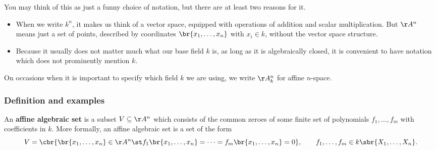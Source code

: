 You may think of this as just a funny choice of notation, but there are at least two reasons for it.
\begin{itemize}
\item When we write $ k^n $, it makes us think of a vector space, equipped with operations of addition and scalar multiplication. But $ \AA^n $ means just a set of points, described by coordinates $ \br{x_1, \dots, x_n} $ with $ x_i \in k $, without the vector space structure.
\item Because it usually does not matter much what our base field $ k $ is, as long as it is algebraically closed, it is convenient to have notation which does not prominently mention $ k $.
\end{itemize}
On occasions when it is important to specify which field $ k $ we are using, we write $ \AA_k^n $ for affine $ n $-space.

\subsubsection{Definition and examples}


\begin{definition*}
An \textbf{affine algebraic set} is a subset $ V \subseteq \AA^n $ which consists of the common zeroes of some finite set of polynomials $ f_1, \dots, f_m $ with coefficients in $ k $. More formally, an affine algebraic set is a set of the form
$$ V = \cbr{\br{x_1, \dots, x_n} \in \AA^n \st f_1\br{x_1, \dots, x_n} = \dots = f_m\br{x_1, \dots, x_n} = 0}, \qquad f_1, \dots, f_m \in k\sbr{X_1, \dots, X_n}. $$
\end{definition*}

